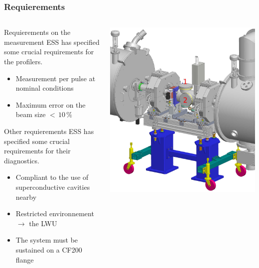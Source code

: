 \begin{frame}
  \frametitle{Requierements}
  \begin{columns}
    \begin{column}{0.45\textwidth}
      \begin{block}{Requierements on the measurement}
        ESS has specified some crucial requirements for the profilers.
        \begin{itemize}
          \item Measurement per pulse at nominal conditions
          \item Maximum error on the beam size $<\,10\,\%$
        \end{itemize}
      \end{block}
      \begin{block}{Other requierements}
        ESS has specified some crucial requirements for their diagnostics.
        \begin{itemize}
          \item Compliant to the use of superconductive cavities nearby
          \item Restricted environnement $\rightarrow$ the LWU
          \item The system must be sustained on a CF200 flange
        \end{itemize}
      \end{block}
    \end{column}
    \begin{column}{0.45\textwidth}
      \includegraphics[width=\textwidth]{03_SIM/fig/fig016_LWU_Cryo4}
    \end{column}
  \end{columns}
\end{frame}

